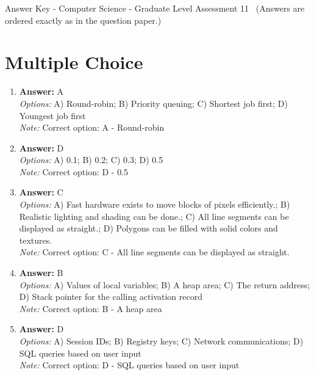 \documentclass[12pt]{article}
\begin{document}
\begin{center}
Answer Key - Computer Science - Graduate Level Assessment 11 \
\small (Answers are ordered exactly as in the question paper.)
\end{center}

\section*{Multiple Choice}
\begin{enumerate}[label=\arabic*.]
\item \textbf{Answer:} A
\\ \textit{Options:} A) Round-robin; B) Priority queuing; C) Shortest job first; D) Youngest job first
\\ \textit{Note:} Correct option: A - Round-robin
\item \textbf{Answer:} D
\\ \textit{Options:} A) 0.1; B) 0.2; C) 0.3; D) 0.5
\\ \textit{Note:} Correct option: D - 0.5
\item \textbf{Answer:} C
\\ \textit{Options:} A) Fast hardware exists to move blocks of pixels efficiently.; B) Realistic lighting and shading can be done.; C) All line segments can be displayed as straight.; D) Polygons can be filled with solid colors and textures.
\\ \textit{Note:} Correct option: C - All line segments can be displayed as straight.
\item \textbf{Answer:} B
\\ \textit{Options:} A) Values of local variables; B) A heap area; C) The return address; D) Stack pointer for the calling activation record
\\ \textit{Note:} Correct option: B - A heap area
\item \textbf{Answer:} D
\\ \textit{Options:} A) Session IDs; B) Registry keys; C) Network communications; D) SQL queries based on user input
\\ \textit{Note:} Correct option: D - SQL queries based on user input
\end{enumerate}
\end{document}
